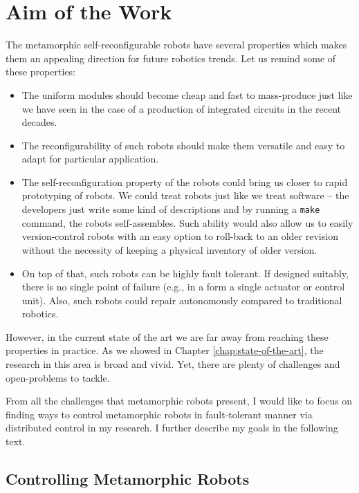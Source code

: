 \chapter{Aim of the Work}

The metamorphic self-reconfigurable robots have several properties which makes
them an appealing direction for future robotics trends. Let us remind some
of these properties:
\begin{itemize}
    \item The uniform modules should become cheap and fast to mass-produce just
    like we have seen in the case of a production of integrated circuits in the
    recent decades.
    \item The reconfigurability of such robots should make them versatile and
    easy to adapt for particular application.
    \item The self-reconfiguration property of the robots could bring us closer
    to rapid prototyping of robots. We could treat robots just like we treat
    software -- the developers just write some kind of descriptions and by
    running a \texttt{make} command, the robots self-assembles. Such ability
    would also allow us to easily version-control robots with an easy option to
    roll-back to an older revision without the necessity of keeping a physical
    inventory of older version.
    \item On top of that, such robots can be highly fault tolerant. If designed
    suitably, there is no single point of failure (e.g., in a form a single
    actuator or control unit). Also, such robots could repair autonomously
    compared to traditional robotics.
\end{itemize}

However, in the current state of the art we are far away from reaching these
properties in practice. As we showed in Chapter \ref{chap:state-of-the-art}, the
research in this area is broad and vivid. Yet, there are plenty of challenges
and open-problems to tackle.

From all the challenges that metamorphic robots present, I would like to focus
on finding ways to control metamorphic robots in fault-tolerant manner via
distributed control in my research. I further describe my goals in the following
text.

\section{Controlling Metamorphic Robots}

